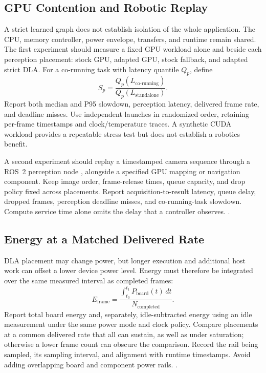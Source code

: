 \subsection{GPU Contention and Robotic Replay}
A strict learned graph does not establish isolation of the whole application.
The CPU, memory controller, power envelope, transfers, and runtime remain shared.
The first experiment should measure a fixed GPU workload alone and beside each
perception placement: stock GPU, adapted GPU, stock fallback, and adapted strict
DLA. For a co-running task with latency quantile $Q_p$, define
\begin{equation}
 S_p=\frac{Q_p(L_{\mathrm{co\text{-}running}})}
             {Q_p(L_{\mathrm{standalone}})}.
 \label{eq:slowdown}
\end{equation}
Report both median and P95 slowdown, perception latency, delivered frame rate,
and deadline misses. Use independent launches in randomized order, retaining
per-frame timestamps and clock/temperature traces. A synthetic CUDA workload
provides a repeatable stress test but does not establish a robotics benefit.

A second experiment should replay a timestamped camera sequence through a ROS~2
perception node \cite{macenski2022ros2}, alongside a specified GPU mapping or
navigation component. Keep image order, frame-release times, queue capacity, and
drop policy fixed across placements. Report acquisition-to-result latency,
queue delay, dropped frames, perception deadline misses, and co-running-task
slowdown. Compute service time alone omits the delay that a controller observes.
.

\subsection{Energy at a Matched Delivered Rate}
DLA placement may change power, but longer execution and additional host work
can offset a lower device power level. Energy must therefore be integrated over
the same measured interval as completed frames:
\begin{equation}
 E_{\mathrm{frame}}=\frac{\int_{t_0}^{t_1}P_{\mathrm{board}}(t)\,dt}
 {N_{\mathrm{completed}}}.
 \label{eq:energy}
\end{equation}
Report total board energy and, separately, idle-subtracted energy using an idle
measurement under the same power mode and clock policy. Compare placements at
a common delivered rate that all can sustain, as well as under saturation;
otherwise a lower frame count can obscure the comparison. Record the rail
being sampled, its sampling interval, and alignment with runtime timestamps.
Avoid adding overlapping board and component power rails.
.

